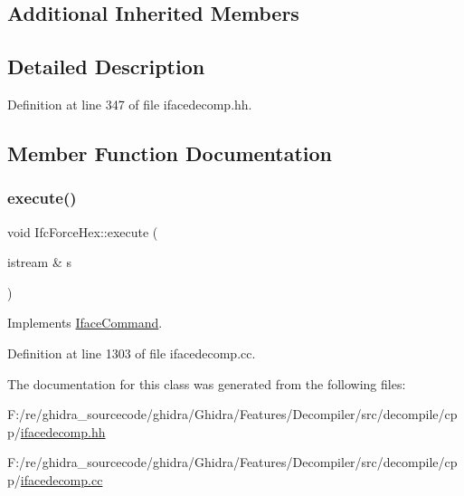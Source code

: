 \subsection*{Additional Inherited Members}


\subsection{Detailed Description}


Definition at line 347 of file ifacedecomp.\+hh.



\subsection{Member Function Documentation}
\mbox{\label{class_ifc_force_hex_aeff89103d37c60da98f84ad8fbd0b4b1}} 
\subsubsection{\texorpdfstring{execute()}{execute()}}
{\footnotesize\ttfamily void Ifc\+Force\+Hex\+::execute (\begin{DoxyParamCaption}\item[{istream \&}]{s }\end{DoxyParamCaption})\hspace{0.3cm}{\ttfamily [virtual]}}



Implements \mbox{\hyperlink{class_iface_command_af10e29cee2c8e419de6efe9e680ad201}{Iface\+Command}}.



Definition at line 1303 of file ifacedecomp.\+cc.



The documentation for this class was generated from the following files\+:\begin{DoxyCompactItemize}
\item 
F\+:/re/ghidra\+\_\+sourcecode/ghidra/\+Ghidra/\+Features/\+Decompiler/src/decompile/cpp/\mbox{\hyperlink{ifacedecomp_8hh}{ifacedecomp.\+hh}}\item 
F\+:/re/ghidra\+\_\+sourcecode/ghidra/\+Ghidra/\+Features/\+Decompiler/src/decompile/cpp/\mbox{\hyperlink{ifacedecomp_8cc}{ifacedecomp.\+cc}}\end{DoxyCompactItemize}
